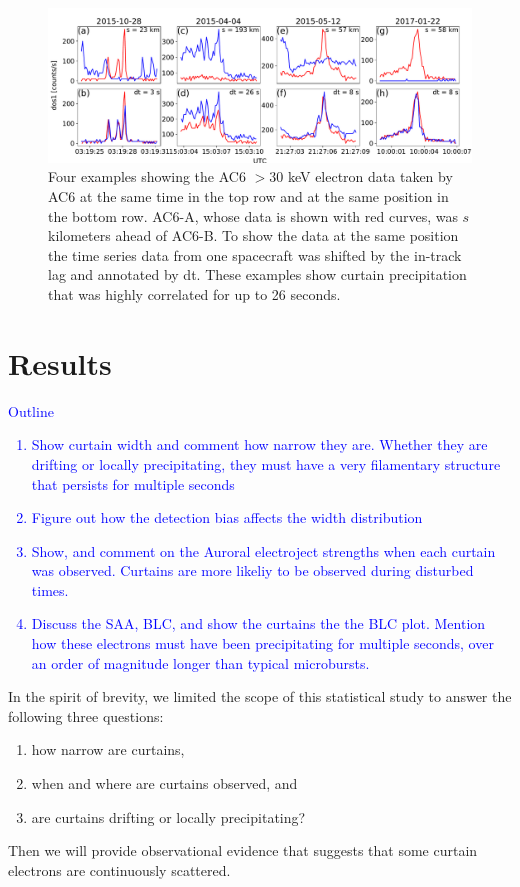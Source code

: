 \documentclass[draft]{agujournal2019}
\begin{document}
\begin{figure}
\includegraphics[width=\textwidth]{fig1.pdf}
\caption{Four examples showing the AC6 $> 30$ keV electron data taken by AC6 at the same time in the top row and at the same position in the bottom row. AC6-A, whose data is shown with red curves, was $s$ kilometers ahead of AC6-B. To show the data at the same position the time series data from one spacecraft was shifted by the in-track lag and annotated by dt. These examples show curtain precipitation that was highly correlated for up to 26 seconds.}
\label{fig1}
\end{figure}

\section{Results} \label{results}
\textcolor{blue}{
Outline
\begin{enumerate}
\item Show curtain width and comment how narrow they are. Whether they are drifting or locally precipitating, they must have a very filamentary structure that persists for multiple seconds
\item Figure out how the detection bias affects the width distribution
\item Show, and comment on the Auroral electroject strengths when each curtain was observed. Curtains are more likeliy to be observed during disturbed times.
\item Discuss the SAA, BLC, and show the curtains the the BLC plot. Mention how these electrons must have been precipitating for multiple seconds, over an order of magnitude longer than typical microbursts.
\end{enumerate}
}

In the spirit of brevity, we limited the scope of this statistical study to answer the following three questions:

\begin{enumerate}
\item how narrow are curtains,
\item when and where are curtains observed, and
\item are curtains drifting or locally precipitating?
\end{enumerate} Then we will provide observational evidence that suggests that some curtain electrons are continuously scattered.
\end{document}

